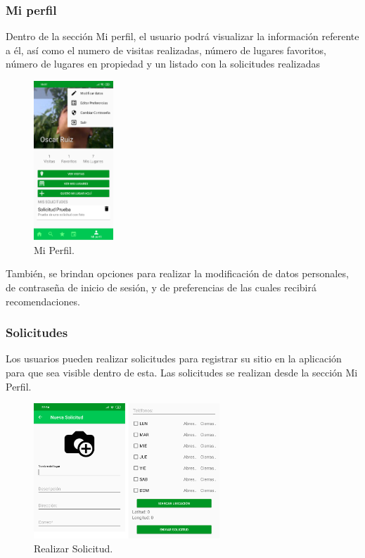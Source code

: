 \documentclass[12pt,letterpaper,openany]{book}
\begin{document}
\subsubsection{Mi perfil}
Dentro de la sección Mi perfil, el usuario podrá visualizar la información referente a él, así como el numero de visitas realizadas, número de  lugares favoritos, número de lugares en propiedad y un listado con la solicitudes realizadas\\
\begin{figure}[H]
\begin{center}
\includegraphics[width=3cm]{./imagenes/5}
\caption{Mi Perfil.}
\end{center}
\end{figure}
También, se brindan opciones para realizar la modificación de datos personales, de contraseña de inicio de sesión, y de preferencias de las cuales recibirá recomendaciones.

\subsubsection{Solicitudes}
Los usuarios pueden realizar solicitudes para registrar su sitio en la aplicación para que sea visible dentro de esta. Las solicitudes se realizan desde la sección Mi Perfil.\\
\begin{figure}[H]
\begin{center}
\includegraphics[width=7cm]{./imagenes/6}
\caption{Realizar Solicitud.}
\end{center}
\end{figure}
\end{document}
